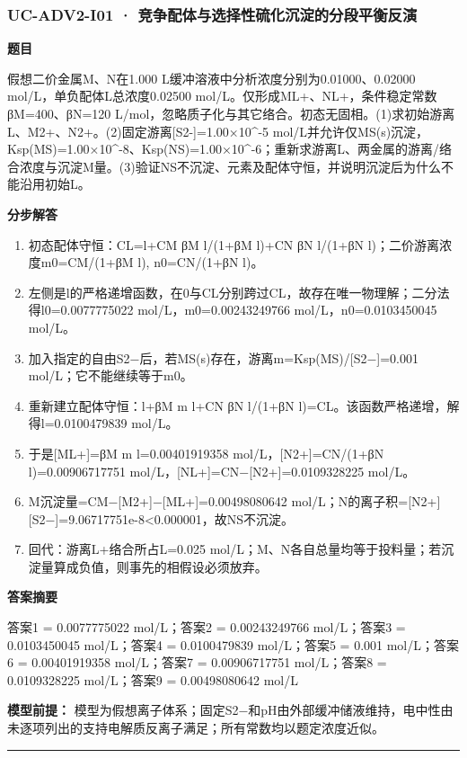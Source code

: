 \documentclass[UTF8,11pt,a4paper]{ctexart}
\begin{document}
\subsubsection*{UC-ADV2-I01 · 竞争配体与选择性硫化沉淀的分段平衡反演}
\noindent\textbf{题目}\par
假想二价金属M、N在1.000 L缓冲溶液中分析浓度分别为0.01000、0.02000 mol/L，单负配体L总浓度0.02500 mol/L。仅形成ML+、NL+，条件稳定常数βM=400、βN=120 L/mol，忽略质子化与其它络合。初态无固相。(1)求初始游离L、M2+、N2+。(2)固定游离[S2-]=1.00×10\textasciicircum{}-5 mol/L并允许仅MS(s)沉淀，Ksp(MS)=1.00×10\textasciicircum{}-8、Ksp(NS)=1.00×10\textasciicircum{}-6；重新求游离L、两金属的游离/络合浓度与沉淀M量。(3)验证NS不沉淀、元素及配体守恒，并说明沉淀后为什么不能沿用初始L。\par
\medskip\noindent\textbf{分步解答}
\begin{enumerate}
\item 初态配体守恒：CL=l+CM βM l/(1+βM l)+CN βN l/(1+βN l)；二价游离浓度m0=CM/(1+βM l), n0=CN/(1+βN l)。
\item 左侧是l的严格递增函数，在0与CL分别跨过CL，故存在唯一物理解；二分法得l0=0.0077775022 mol/L，m0=0.00243249766 mol/L，n0=0.0103450045 mol/L。
\item 加入指定的自由S2−后，若MS(s)存在，游离m=Ksp(MS)/[S2−]=0.001 mol/L；它不能继续等于m0。
\item 重新建立配体守恒：l+βM m l+CN βN l/(1+βN l)=CL。该函数严格递增，解得l=0.0100479839 mol/L。
\item 于是[ML+]=βM m l=0.00401919358 mol/L，[N2+]=CN/(1+βN l)=0.00906717751 mol/L，[NL+]=CN−[N2+]=0.0109328225 mol/L。
\item M沉淀量=CM−[M2+]−[ML+]=0.00498080642 mol/L；N的离子积=[N2+][S2−]=9.06717751e-8<0.000001，故NS不沉淀。
\item 回代：游离L+络合所占L=0.025 mol/L；M、N各自总量均等于投料量；若沉淀量算成负值，则事先的相假设必须放弃。
\end{enumerate}
\noindent\textbf{答案摘要}\par
答案1 = 0.0077775022 mol/L；答案2 = 0.00243249766 mol/L；答案3 = 0.0103450045 mol/L；答案4 = 0.0100479839 mol/L；答案5 = 0.001 mol/L；答案6 = 0.00401919358 mol/L；答案7 = 0.00906717751 mol/L；答案8 = 0.0109328225 mol/L；答案9 = 0.00498080642 mol/L\par
\noindent\textbf{模型前提：}
模型为假想离子体系；固定S2−和pH由外部缓冲储液维持，电中性由未逐项列出的支持电解质反离子满足；所有常数均以题定浓度近似。\par
\medskip\hrule\medskip
{}
\end{document}
